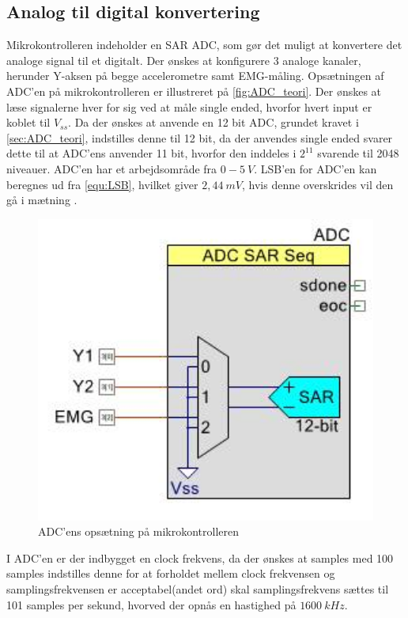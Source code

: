 \subsection{Analog til digital konvertering}
Mikrokontrolleren indeholder en SAR ADC, som gør det muligt at konvertere det analoge signal til et digitalt. Der ønskes at konfigurere 3 analoge kanaler, herunder Y-aksen på begge accelerometre samt EMG-måling. Opsætningen af ADC'en på mikrokontrolleren er illustreret på \autoref{fig:ADC_teori}. Der ønskes at læse signalerne hver for sig ved at måle single ended, hvorfor hvert input er koblet til $V_{ss}$.  Da der ønskes at anvende en 12 bit ADC, grundet kravet i \autoref{sec:ADC_teori}, indstilles denne til 12 bit, da der anvendes single ended svarer dette til at ADC'ens anvender 11 bit, hvorfor den inddeles i $2^{11}$ svarende til 2048 niveauer. ADC'en har et arbejdsområde fra $0-5~V$. LSB'en for ADC'en kan beregnes ud fra \autoref{equ:LSB}, hvilket giver $2,44~mV$, hvis denne overskrides vil den gå i mætning \citep{ADC2014}. 
\begin{figure}[H]
\centering
\includegraphics[width=1\textwidth]{figures/implementering/ADC_imp.jpeg}
\caption{ADC'ens opsætning på mikrokontrolleren}
\label{fig:ADC_teori}
\end{figure}

I ADC'en er der indbygget en clock frekvens, da der ønskes at samples med 100 samples indstilles denne for at forholdet mellem clock frekvensen og samplingsfrekvensen er acceptabel(andet ord) skal samplingsfrekvens sættes til 101 samples per sekund, hvorved der opnås en hastighed på $1600~kHz$. 
